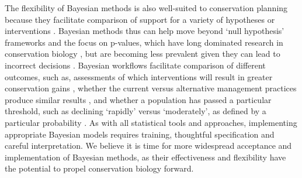 \documentclass{article}
\begin{document}
\par The flexibility of Bayesian methods is also well-suited to conservation planning because they facilitate comparison of support for a variety of hypotheses or interventions \citep{Zyl2018}. %
Bayesian methods thus can help move beyond `null hypothesis' frameworks and the focus on p-values, which have long dominated research in conservation biology \citep[as in ecology and related biological fields, e.g., ecotoxicaology][]{erickson2020moving}, but are  becoming less prevalent given they can lead to incorrect decisions \citep{halsey2019reign}. 
Bayesian workflows facilitate comparison of different outcomes, such as, assessments of which interventions will result in greater conservation gains \citep{prato2005bayesian}, whether the current versus alternative management practices produce similar results \citep{gallistel2009importance}, and whether a population has passed a particular threshold, such as declining `rapidly' versus `moderately', as defined by a particular probability \citep{brooks2008quantifying}. As with all statistical tools and approaches, implementing appropriate Bayesian models requires training, thoughtful specification and careful interpretation. We believe it is time for more widespread acceptance and implementation of Bayesian methods, as their effectiveness and flexibility have the potential to propel conservation biology forward.



\end{document}
